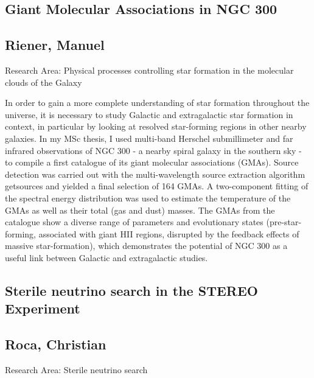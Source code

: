 \subsection*{\centering \large Giant Molecular Associations in NGC 300}
\subsection*{\centering \normalsize Riener, Manuel}
Research Area: Physical processes controlling star formation in the molecular clouds of the Galaxy\newline

\noindent In order to gain a more complete understanding of star formation throughout the universe, it is necessary to study Galactic and extragalactic star formation in context, in particular by looking at resolved star-forming regions in other nearby galaxies. In my MSc thesis, I used multi-band Herschel submillimeter and far infrared observations of NGC 300 - a nearby spiral galaxy in the southern sky - to compile a first catalogue of its giant molecular associations (GMAs). Source detection was carried out with the multi-wavelength source extraction algorithm getsources and yielded a final selection of 164 GMAs. A two-component fitting of the spectral energy distribution was used to estimate the temperature of the GMAs as well as their total (gas and dust) masses. The GMAs from the catalogue show a diverse range of parameters and evolutionary states (pre-star-forming, associated with giant HII regions, disrupted by the feedback effects of massive star-formation), which demonstrates the potential of NGC 300 as a useful link between Galactic and extragalactic studies.

\subsection*{\centering \large Sterile neutrino search in the STEREO Experiment}
\subsection*{\centering \normalsize Roca, Christian}
Research Area: \newline Sterile neutrino search

